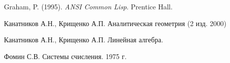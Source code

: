 \begin{thebibliography}{}
	
	 Graham, P. (1995). \textit{ANSI Common Lisp}. Prentice Hall.

	 Канатников А.Н., Крищенко А.П. Аналитическая геометрия (2 изд. 2000)
	
	 Канатников А.Н., Крищенко А.П. Линейная алгебра.
	
	 Фомин С.В. Системы счисления. 1975 г.
	
	
\end{thebibliography}

